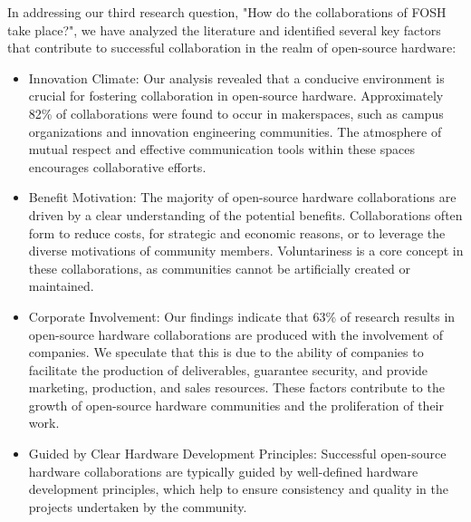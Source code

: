 \documentclass[final-report.tex]{subfiles}
\begin{document}
In addressing our third research question, "How do the collaborations of FOSH take place?", we have analyzed the literature and identified several key factors that contribute to successful collaboration in the realm of open-source hardware:
\begin{itemize}
    \item Innovation Climate: Our analysis revealed that a conducive environment is crucial for fostering collaboration in open-source hardware. Approximately 82\% of collaborations were found to occur in makerspaces, such as campus organizations and innovation engineering communities. The atmosphere of mutual respect and effective communication tools within these spaces encourages collaborative efforts.
    \item Benefit Motivation: The majority of open-source hardware collaborations are driven by a clear understanding of the potential benefits. Collaborations often form to reduce costs, for strategic and economic reasons, or to leverage the diverse motivations of community members. Voluntariness is a core concept in these collaborations, as communities cannot be artificially created or maintained.
    \item Corporate Involvement: Our findings indicate that 63\% of research results in open-source hardware collaborations are produced with the involvement of companies. We speculate that this is due to the ability of companies to facilitate the production of deliverables, guarantee security, and provide marketing, production, and sales resources. These factors contribute to the growth of open-source hardware communities and the proliferation of their work.
    \item Guided by Clear Hardware Development Principles: Successful open-source hardware collaborations are typically guided by well-defined hardware development principles, which help to ensure consistency and quality in the projects undertaken by the community.
\end{itemize}
\end{document}
